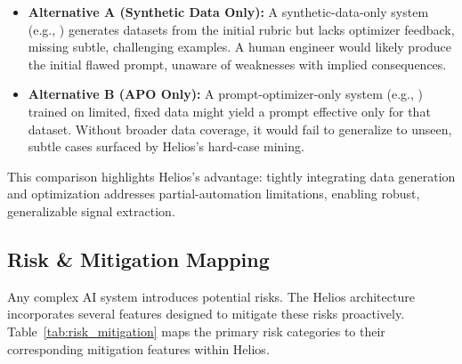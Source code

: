 \documentclass{article}
\begin{document}
\begin{itemize}
  \item \textbf{Alternative A (Synthetic Data Only):} A synthetic-data-only system (e.g., \citep{patel2024datadreamertoolsyntheticdata}) generates datasets from the initial rubric but lacks optimizer feedback, missing subtle, challenging examples. A human engineer would likely produce the initial flawed prompt, unaware of weaknesses with implied consequences.

  \item \textbf{Alternative B (APO Only):} A prompt-optimizer-only system (e.g., \citep{pryzant2023automaticpromptoptimizationgradient}) trained on limited, fixed data might yield a prompt effective only for that dataset. Without broader data coverage, it would fail to generalize to unseen, subtle cases surfaced by Helios's hard-case mining.
\end{itemize}

This comparison highlights Helios's advantage: tightly integrating data generation and optimization addresses partial-automation limitations, enabling robust, generalizable signal extraction.

\subsection{Risk \& Mitigation Mapping}
\label{subsec:risk_mitigation}
Any complex AI system introduces potential risks. The Helios architecture incorporates several features designed to mitigate these risks proactively. Table~\ref{tab:risk_mitigation} maps the primary risk categories to their corresponding mitigation features within Helios.
\end{document}
